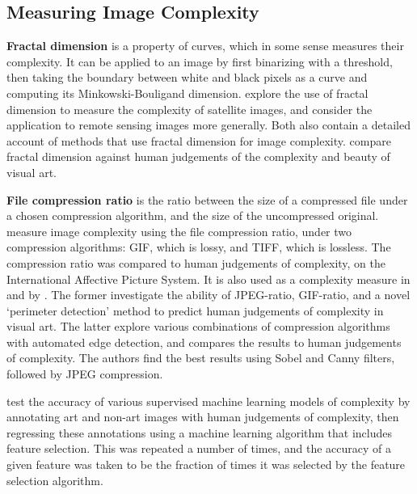 \documentclass[a4paper,fleqn]{cas-sc}
\theoremstyle{remark}
\begin{document}
\subsection{Measuring Image Complexity} \label{subsec:img-complexity}
\textbf{Fractal dimension} is a property of curves, which in some sense measures their complexity. 
It can be applied to an image by first binarizing with a threshold, then taking the boundary between white and black pixels as a curve and computing its Minkowski-Bouligand dimension. \citet{lam2002evaluation} explore the use of fractal dimension to measure the complexity of satellite images, and \citet{sun2006fractal} consider the application to remote sensing images more generally. Both also contain a detailed account of methods that use fractal dimension for image complexity. \citet{forsythe2011predicting} compare fractal dimension against human judgements of the complexity and beauty of visual art.

\textbf{File compression ratio} is the ratio between the size of a compressed file under a chosen compression algorithm, and the size of the uncompressed original. \citet{marin2013examining} measure image complexity using the file compression ratio, under two compression algorithms: GIF, which is lossy, and TIFF, which is lossless. The compression ratio was compared to human judgements of complexity, on the International Affective Picture System. It is also used as a complexity measure in \citet{forsythe2011predicting} and by \citet{machado2015computerized}. The former investigate the ability of JPEG-ratio, GIF-ratio, and a novel `perimeter detection' method to predict human judgements of complexity in visual art. The latter explore various combinations of compression algorithms with automated edge detection, and compares the results to human judgements of complexity. The authors find the best results using Sobel and Canny filters, followed by JPEG compression. 

\citet{carballal2020comparison} test the accuracy of various supervised machine learning models of complexity by annotating art and non-art images with human judgements of complexity, then regressing these annotations using a machine learning algorithm that includes feature selection. This was repeated a number of times, and the accuracy of a given feature was taken to be the fraction of times it was selected by the feature selection algorithm.
\end{document}
